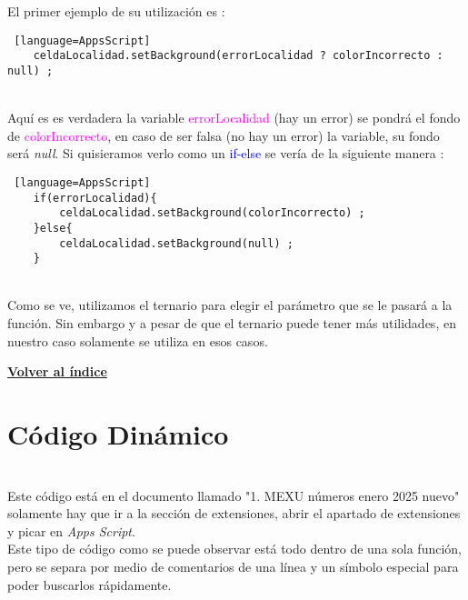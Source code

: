 \documentclass[12pt]{article} %
\begin{document}
    El primer ejemplo de su utilización es :

    \begin{lstlisting} [language=AppsScript]
    celdaLocalidad.setBackground(errorLocalidad ? colorIncorrecto : null) ;
    \end{lstlisting} \\

    Aquí es es verdadera la variable \textcolor{magenta}{errorLocalidad} (hay un error) se pondrá el fondo de \textcolor{magenta}{colorIncorrecto}, en caso de ser falsa (no hay un error) la variable, su fondo será \textit{null}. Si quisieramos verlo como un \textcolor{blue}{if-else} se vería de la siguiente manera :\\

    \begin{lstlisting} [language=AppsScript]
    if(errorLocalidad){
        celdaLocalidad.setBackground(colorIncorrecto) ;
    }else{
        celdaLocalidad.setBackground(null) ;
    }
    \end{lstlisting} \\

    Como se ve, utilizamos el ternario para elegir el parámetro que se le pasará a la función. Sin embargo y a pesar de que el ternario puede tener más utilidades, en nuestro caso solamente se utiliza en esos casos.



    

            \begin{flushright}
                \hyperlink{toc}{\textbf{Volver al índice}}
            \end{flushright}



    \newpage

    \section*{Código Dinámico}
    \\

    Este código está en el documento llamado "1. MEXU números enero 2025 nuevo" solamente hay que ir a la sección de extensiones, abrir el apartado de extensiones y picar en \textit{Apps Script}. \\

    Este tipo de código como se puede observar está todo dentro de una sola función, pero se separa por medio de comentarios de una línea y un símbolo especial para poder buscarlos rápidamente. \\
\end{document}
